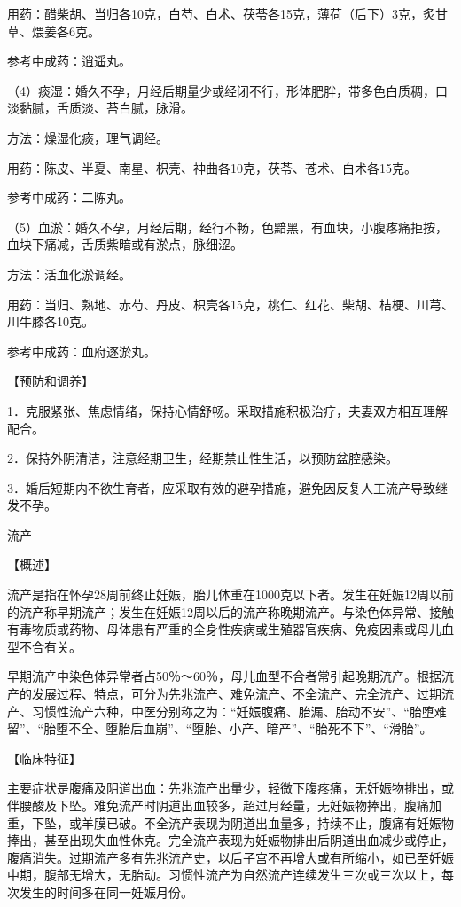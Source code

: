 \documentclass[12pt,UTF8]{ctexbook}
\begin{document}
用药：醋柴胡、当归各10克，白芍、白术、茯苓各15克，薄荷（后下）3克，炙甘草、煨姜各6克。

参考中成药：逍遥丸。

（4）痰湿：婚久不孕，月经后期量少或经闭不行，形体肥胖，带多色白质稠，口淡黏腻，舌质淡、苔白腻，脉滑。

方法：燥湿化痰，理气调经。

用药：陈皮、半夏、南星、枳壳、神曲各10克，茯苓、苍术、白术各15克。

参考中成药：二陈丸。

（5）血淤：婚久不孕，月经后期，经行不畅，色黯黑，有血块，小腹疼痛拒按，血块下痛减，舌质紫暗或有淤点，脉细涩。

方法：活血化淤调经。

用药：当归、熟地、赤芍、丹皮、枳壳各15克，桃仁、红花、柴胡、桔梗、川芎、川牛膝各10克。

参考中成药：血府逐淤丸。

【预防和调养】

1．克服紧张、焦虑情绪，保持心情舒畅。采取措施积极治疗，夫妻双方相互理解配合。

2．保持外阴清洁，注意经期卫生，经期禁止性生活，以预防盆腔感染。

3．婚后短期内不欲生育者，应采取有效的避孕措施，避免因反复人工流产导致继发不孕。





流产


【概述】

流产是指在怀孕28周前终止妊娠，胎儿体重在1000克以下者。发生在妊娠12周以前的流产称早期流产；发生在妊娠12周以后的流产称晚期流产。与染色体异常、接触有毒物质或药物、母体患有严重的全身性疾病或生殖器官疾病、免疫因素或母儿血型不合有关。

早期流产中染色体异常者占50％～60％，母儿血型不合者常引起晚期流产。根据流产的发展过程、特点，可分为先兆流产、难免流产、不全流产、完全流产、过期流产、习惯性流产六种，中医分别称之为：“妊娠腹痛、胎漏、胎动不安”、“胎堕难留”、“胎堕不全、堕胎后血崩”、“堕胎、小产、暗产”、“胎死不下”、“滑胎”。

【临床特征】

主要症状是腹痛及阴道出血：先兆流产出量少，轻微下腹疼痛，无妊娠物排出，或伴腰酸及下坠。难免流产时阴道出血较多，超过月经量，无妊娠物捧出，腹痛加重，下坠，或羊膜已破。不全流产表现为阴道出血量多，持续不止，腹痛有妊娠物捧出，甚至出现失血性休克。完全流产表现为妊娠物排出后阴道出血减少或停止，腹痛消失。过期流产多有先兆流产史，以后子宫不再增大或有所缩小，如已至妊娠中期，腹部无增大，无胎动。习惯性流产为自然流产连续发生三次或三次以上，每次发生的时间多在同一妊娠月份。
\end{document}
